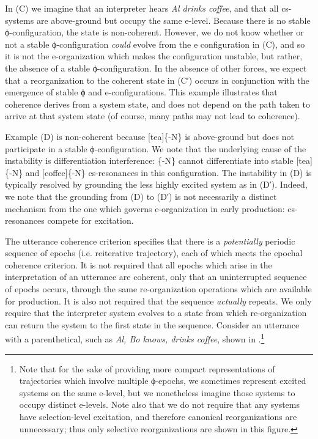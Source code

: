   In (C) we imagine that an interpreter hears \textit{Al drinks coffee}, and that all cs-systems are above-ground but occupy the same e-level. Because there is no stable ϕ-configuration, the state is non-coherent. However, we do not know whether or not a stable ϕ-configuration \textit{could} evolve from the e configuration in (C), and so it is not the e-organization which makes the configuration unstable, but rather, the absence of a stable ϕ-configuration. In the absence of other forces, we expect that a reorganization to the coherent state in (C′) occurs in conjunction with the emergence of stable ϕ and e-configurations. This example illustrates that coherence derives from a system state, and does not depend on the path taken to arrive at that system state (of course, many paths may not lead to coherence). 

  Example (D) is non-coherent because [tea]\{-N\} is above-ground but does not participate in a stable ϕ-configuration. We note that the underlying cause of the instability is differentiation interference: \{-N\} cannot differentiate into stable [tea]\{-N\} and [coffee]\{-N\} cs-resonances in this configuration. The instability in (D) is typically resolved by grounding the less highly excited system as in (D′). Indeed, we note that the grounding from (D) to (D′) is not necessarily a distinct mechanism from the one which governs e-organization in early production: cs-resonances compete for excitation.

The utterance coherence criterion specifies that there is a \textit{potentially} periodic sequence of epochs (i.e. reiterative trajectory), each of which meets the epochal coherence criterion. It is not required that all epochs which arise in the interpretation of an utterance are coherent, only that an uninterrupted sequence of epochs occurs, through the same re-organization operations which are available for production. It is also not required that the sequence \textit{actually} repeats. We only require that the interpreter system evolves to a state from which re-organization can return the system to the first state in the sequence. Consider an utterance with a parenthetical, such as \textit{Al, Bo knows, drinks coffee}, shown in {}.\footnote{Note that for the sake of providing more compact representations of trajectories which involve multiple ϕ-epochs, we sometimes represent excited systems on the same e-level, but we nonetheless imagine those systems to occupy distinct e-levels. Note also that we do not require that any systems have selection-level excitation, and therefore canonical reorganizations are unnecessary; thus only selective reorganizations are shown in this figure.}

